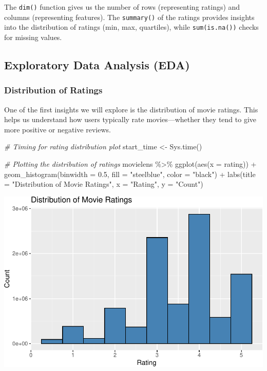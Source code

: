 \documentclass[
]{article}
\newenvironment{Shaded}{}{}
\newcommand{\AttributeTok}[1]{\textcolor[rgb]{0.49,0.56,0.16}{#1}}
\newcommand{\CommentTok}[1]{\textcolor[rgb]{0.38,0.63,0.69}{\textit{#1}}}
\newcommand{\FloatTok}[1]{\textcolor[rgb]{0.25,0.63,0.44}{#1}}
\newcommand{\FunctionTok}[1]{\textcolor[rgb]{0.02,0.16,0.49}{#1}}
\newcommand{\NormalTok}[1]{#1}
\newcommand{\OtherTok}[1]{\textcolor[rgb]{0.00,0.44,0.13}{#1}}
\newcommand{\SpecialCharTok}[1]{\textcolor[rgb]{0.25,0.44,0.63}{#1}}
\newcommand{\StringTok}[1]{\textcolor[rgb]{0.25,0.44,0.63}{#1}}
\begin{document}
The \texttt{dim()} function gives us the number of rows (representing
ratings) and columns (representing features). The \texttt{summary()} of
the ratings provides insights into the distribution of ratings (min,
max, quartiles), while \texttt{sum(is.na())} checks for missing values.

\subsection{Exploratory Data Analysis
(EDA)}\label{exploratory-data-analysis-eda}

\subsubsection{Distribution of Ratings}\label{distribution-of-ratings}

One of the first insights we will explore is the distribution of movie
ratings. This helps us understand how users typically rate
movies---whether they tend to give more positive or negative reviews.

\begin{Shaded}
\begin{Highlighting}[]
\CommentTok{\# Timing for rating distribution plot}
\NormalTok{start\_time }\OtherTok{\textless{}{-}} \FunctionTok{Sys.time}\NormalTok{()}

\CommentTok{\# Plotting the distribution of ratings}
\NormalTok{movielens }\SpecialCharTok{\%\textgreater{}\%}
  \FunctionTok{ggplot}\NormalTok{(}\FunctionTok{aes}\NormalTok{(}\AttributeTok{x =}\NormalTok{ rating)) }\SpecialCharTok{+}
  \FunctionTok{geom\_histogram}\NormalTok{(}\AttributeTok{binwidth =} \FloatTok{0.5}\NormalTok{, }\AttributeTok{fill =} \StringTok{"steelblue"}\NormalTok{, }\AttributeTok{color =} \StringTok{"black"}\NormalTok{) }\SpecialCharTok{+}
  \FunctionTok{labs}\NormalTok{(}\AttributeTok{title =} \StringTok{"Distribution of Movie Ratings"}\NormalTok{, }\AttributeTok{x =} \StringTok{"Rating"}\NormalTok{, }\AttributeTok{y =} \StringTok{"Count"}\NormalTok{)}
\end{Highlighting}
\end{Shaded}

\begin{center}\includegraphics{BI_MovieLens_Project_HarvardX_Ph125_9x_files/figure-latex/rating_distribution-1} \end{center}
\end{document}
